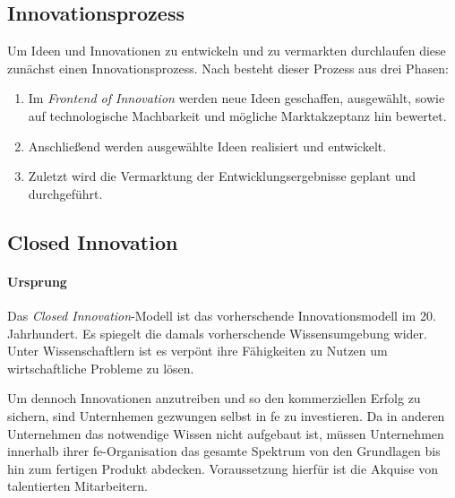 \subsection{Innovationsprozess}\label{sec:grundlagen-prozess}
Um Ideen und Innovationen zu entwickeln und zu vermarkten durchlaufen diese zunächst einen Innovationsprozess.
Nach \cite[10\psq]{herzog2011} besteht dieser Prozess aus drei Phasen:
\begin{enumerate}
    \item Im \textit{Frontend of Innovation} werden neue Ideen geschaffen, ausgewählt, sowie auf technologische Machbarkeit und mögliche Marktakzeptanz hin bewertet.
    \item Anschließend werden ausgewählte Ideen realisiert und entwickelt.
    \item Zuletzt wird die Vermarktung der Entwicklungsergebnisse geplant und durchgeführt.
\end{enumerate}

\subsection{Closed Innovation}\label{sec:grundlagen-closed}

\paragraph{Ursprung}
Das \textit{Closed Innovation}-Modell ist das vorherschende Innovationsmodell im 20. Jahrhundert.
Es spiegelt die damals vorherschende Wissensumgebung wider.
Unter Wissenschaftlern ist es verpönt ihre Fähigkeiten zu Nutzen um wirtschaftliche Probleme zu lösen.

Um dennoch Innovationen anzutreiben und so den kommerziellen Erfolg zu sichern,
sind Unternhemen gezwungen selbst in \ac{fe} zu investieren.
Da in anderen Unternehmen das notwendige Wissen nicht aufgebaut ist,
müssen Unternehmen innerhalb ihrer \ac{fe}-Organisation das gesamte Spektrum von den Grundlagen bis hin zum fertigen Produkt abdecken.
Voraussetzung hierfür ist die Akquise von talentierten Mitarbeitern.


